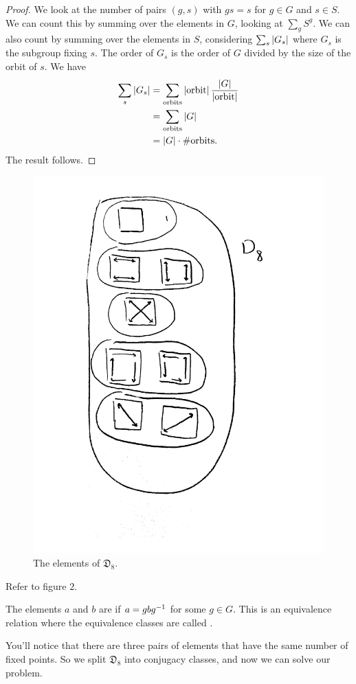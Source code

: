 \documentclass[11pt, twoside]{amsart}
\begin{document}
\begin{proof}
We look at the number of pairs $(g,s)$ with $gs=s$ for $g\in G$ and $s\in S$. We can count this by summing over the elements in $G$, looking at $\sum_g S^g$. We can also count by summing over the elements in $S$, considering $\sum_s \left \lvert G_s \right \rvert$ where $G_s$ is the subgroup fixing $s$. The order of $G_s$ is the order of $G$ divided by the size of the orbit of $s$. We have
\begin{align*}
\sum_s \left \lvert G_s \right \rvert &= \sum_{\textrm{orbits}} \left \lvert \mathrm{orbit} \right \rvert \frac{\left \lvert G \right \rvert}{\left \lvert \mathrm{orbit} \right \rvert}\\
&= \sum_{\textrm{orbits}} \left \lvert G \right \rvert\\
&= \left \lvert G \right \rvert \cdot \# \mathrm{orbits}.
\end{align*}
The result follows.
\end{proof}
\begin{figure}
\centering
\includegraphics[scale=0.3]{images/d8}
\caption{The elements of $\mathfrak{D}_8$.}
\end{figure}
Refer to figure $2$. 
\begin{definition}
The elements $a$ and $b$ are  if $a = gbg^{-1}$ for some $g\in G$. This is an equivalence relation where the equivalence classes are called .
\end{definition}
You'll notice that there are three pairs of elements that have the same number of fixed points. So we split $\mathfrak{D}_8$ into conjugacy classes, and now we can solve our problem. 
\end{document}
